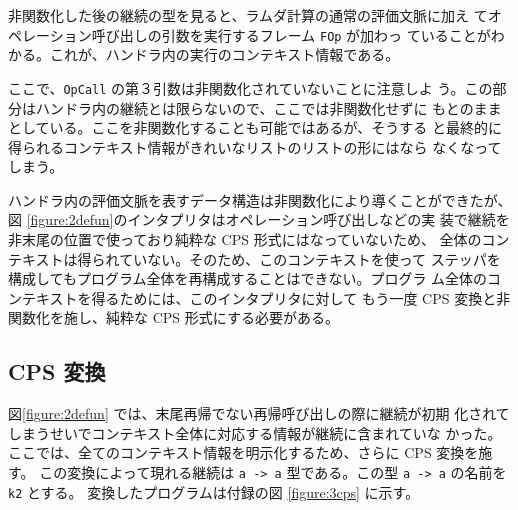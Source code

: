 非関数化した後の継続の型を見ると、ラムダ計算の通常の評価文脈に加え
てオペレーション呼び出しの引数を実行するフレーム \texttt{FOp} が加わっ
ていることがわかる。これが、ハンドラ内の実行のコンテキスト情報である。

ここで、\texttt{OpCall} の第３引数は非関数化されていないことに注意しよ
う。この部分はハンドラ内の継続とは限らないので、ここでは非関数化せずに
もとのままとしている。ここを非関数化することも可能ではあるが、そうする
と最終的に得られるコンテキスト情報がきれいなリストのリストの形にはなら
なくなってしまう。

ハンドラ内の評価文脈を表すデータ構造は非関数化により導くことができたが、
図 \ref{figure:2defun}のインタプリタはオペレーション呼び出しなどの実
装で継続を非末尾の位置で使っており純粋な CPS 形式にはなっていないため、
全体のコンテキストは得られていない。そのため、このコンテキストを使って
ステッパを構成してもプログラム全体を再構成することはできない。プログラ
ム全体のコンテキストを得るためには、このインタプリタに対して
もう一度 CPS 変換と非関数化を施し、純粋な CPS 形式にする必要がある。


\subsection{CPS 変換}
\label{subsection:3cps}

図\ref{figure:2defun} では、末尾再帰でない再帰呼び出しの際に継続が初期
化されてしまうせいでコンテキスト全体に対応する情報が継続に含まれていな
かった。
ここでは、全てのコンテキスト情報を明示化するため、さらに CPS 変換を施
す。
この変換によって現れる継続は \texttt{a -> a} 型である。この型
\texttt{a -> a} の名前を \texttt{k2} とする。
変換したプログラムは付録の図 \ref{figure:3cps} に示す。

